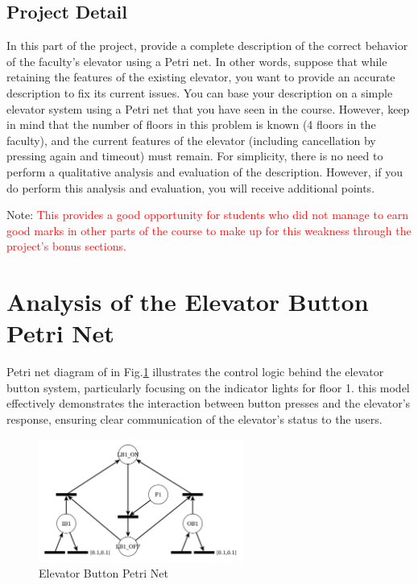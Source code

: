 \documentclass[12pt	]{article}
\begin{document}
\subsection{Project Detail}
In this part of the project, provide a complete description of the correct behavior of the faculty's elevator using a Petri net. In other words, suppose that while retaining the features of the existing elevator, you want to provide an accurate description to fix its current issues. You can base your description on a simple elevator system using a Petri net that you have seen in the course. However, keep in mind that the number of floors in this problem is known (4 floors in the faculty), and the current features of the elevator (including cancellation by pressing again and timeout) must remain. For simplicity, there is no need to perform a qualitative analysis and evaluation of the description. However, if you do perform this analysis and evaluation, you will receive additional points.

Note: \textcolor{red}{This provides a good opportunity for students who did not manage to earn good marks in other parts of the course to make up for this weakness through the project's bonus sections.}










\section{Analysis of the Elevator Button Petri Net}

Petri net diagram of in Fig.\ref{fig:Elevator Button Petri Net} illustrates the control logic behind the elevator button system, particularly focusing on the indicator lights for floor 1. this model effectively demonstrates the interaction between button presses and the elevator's response, ensuring clear communication of the elevator's status to the users.

\begin{figure}[h]
	\centering
	\includegraphics[width=0.6\textwidth]{Images/img11.png}
	\caption{Elevator Button Petri Net}
	\label{fig:Elevator Button Petri Net}
\end{figure}
\end{document}
